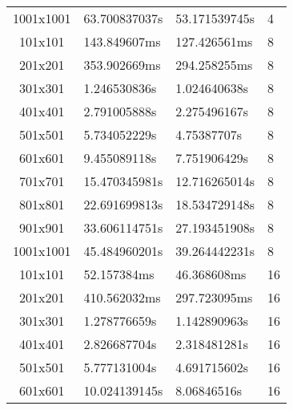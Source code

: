 \begin{table}[]
\begin{tabular}{clll}
1001x1001                                   & 63.700837037s         & 53.171539745s     & 4                      \\
101x101                                     & 143.849607ms           &  127.426561ms      & 8                     \\
201x201                                     & 353.902669ms         & 294.258255ms    & 8                     \\
301x301                                     & 1.246530836s       & 1.024640638s    & 8                     \\
401x401                                     & 2.791005888s      & 2.275496167s    & 8                     \\
501x501                                     & 5.734052229s         & 4.75387707s    & 8                     \\
601x601                                     & 9.455089118s       & 7.751906429s      & 8                     \\
701x701                                     & 15.470345981s      & 12.716265014s   & 8                     \\
801x801                                     & 22.691699813s      & 18.534729148s    & 8                     \\
901x901                                     & 33.606114751s      & 27.193451908s    & 8                     \\
1001x1001                                   & 45.484960201s       & 39.264442231s   & 8                     \\
101x101                                     & 52.157384ms           & 46.368608ms       & 16                     \\
201x201                                     & 410.562032ms          & 297.723095ms      & 16                     \\
301x301                                     & 1.278776659s          & 1.142890963s      & 16                     \\
401x401                                     & 2.826687704s          & 2.318481281s      & 16                     \\
501x501                                     & 5.777131004s          & 4.691715602s      & 16                     \\
601x601                                     & 10.024139145s         & 8.06846516s       & 16                     \\

\end{tabular}
\end{table}
